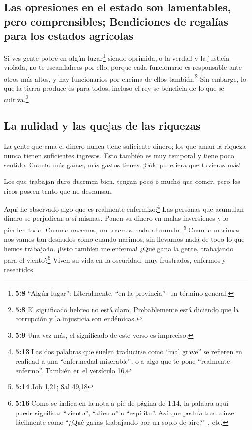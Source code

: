 \hypertarget{las-opresiones-en-el-estado-son-lamentables-pero-comprensibles-bendiciones-de-regaluxedas-para-los-estados-agruxedcolas}{%
\subsection{Las opresiones en el estado son lamentables, pero
comprensibles; Bendiciones de regalías para los estados
agrícolas}\label{las-opresiones-en-el-estado-son-lamentables-pero-comprensibles-bendiciones-de-regaluxedas-para-los-estados-agruxedcolas}}

 Si ves gente pobre en algún lugar\footnote{\textbf{5:8}
  ``Algún lugar'': Literalmente, ``en la provincia'' -un término
  general.} siendo oprimida, o la verdad y la justicia violada, no te
escandalices por ello, porque cada funcionario es responsable ante otros
más altos, y hay funcionarios por encima de ellos también.\footnote{\textbf{5:8}
  El significado hebreo no está claro. Probablemente está diciendo que
  la corrupción y la injusticia son endémicas.}  Sin
embargo, lo que la tierra produce es para todos, incluso el rey se
beneficia de lo que se cultiva.\footnote{\textbf{5:9} Una vez más, el
  significado de este verso es impreciso.}

\hypertarget{la-nulidad-y-las-quejas-de-las-riquezas}{%
\subsection{La nulidad y las quejas de las
riquezas}\label{la-nulidad-y-las-quejas-de-las-riquezas}}

 La gente que ama el dinero nunca tiene suficiente
dinero; los que aman la riqueza nunca tienen suficientes ingresos. Esto
también es muy temporal y tiene poco sentido.  Cuanto más
ganas, más gastos tienes. ¡Sólo pareciera que tuvieras más!

 Los que trabajan duro duermen bien, tengan poco o mucho
que comer, pero los ricos poseen tanto que no descansan.

 Aquí he observado algo que es realmente
enfermizo:\footnote{\textbf{5:13} Las dos palabras que suelen traducirse
  como ``mal grave'' se refieren en realidad a una ``enfermedad
  miserable'', o a algo que te pone ``realmente enfermo''. También en el
  versículo 16.} Las personas que acumulan dinero se perjudican a sí
mismas.  Ponen su dinero en malas inversiones y lo
pierden todo. Cuando nacemos, no traemos nada al mundo. \footnote{\textbf{5:14}
  Job 1,21; Sal 49,18}  Cuando morimos, nos vamos tan
desnudos como cuando nacimos, sin llevarnos nada de todo lo que hemos
trabajado.  ¡Esto también me enferma! ¿Qué gana la gente,
trabajando para el viento?\footnote{\textbf{5:16} Como se indica en la
  nota a pie de página de 1:14, la palabra aquí puede significar
  ``viento'', ``aliento'' o ``espíritu''. Así que podría traducirse
  fácilmente como ``¿Qué ganas trabajando por un soplo de aire?'' , etc.}
 Viven su vida en la oscuridad, muy frustrados, enfermos
y resentidos.


